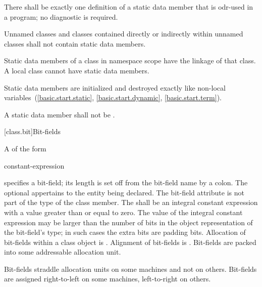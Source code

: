 \pnum
\begin{note}
There shall be exactly one definition of a static data member
that is odr-used in a program; no diagnostic is required.
\end{note}
Unnamed classes and classes contained directly
or indirectly within unnamed classes shall not contain static
data members.

\pnum
\begin{note}
Static data members of a class in namespace scope have the linkage of that class. A local class cannot have static data members.
\end{note}

\pnum
Static data members are initialized and destroyed exactly like
non-local variables~(\ref{basic.start.static}, \ref{basic.start.dynamic},
\ref{basic.start.term}).

\pnum
A static data member shall not be
.

[class.bit]{Bit-fields}%

\pnum
A  of the form

\begin{ncsimplebnf}
  \terminal{:} constant-expression 
\end{ncsimplebnf}

%
%
specifies a bit-field;
its length is set off from the bit-field name by a colon. The optional  appertains to the entity being declared. The bit-field
attribute is not part of the type of the class member. The
 shall be an integral constant expression
with a value greater than or equal to zero. The
value of the integral constant expression may
be larger than the number of bits in the object
representation of the bit-field's type; in such
cases the extra bits are padding bits.
%
Allocation of bit-fields within a class object is
.
%
Alignment of bit-fields is .
%
Bit-fields are packed into some addressable allocation unit.
\begin{note}
Bit-fields straddle allocation units on some machines and not on others.
Bit-fields are assigned right-to-left on some machines, left-to-right on
others.
\end{note}

